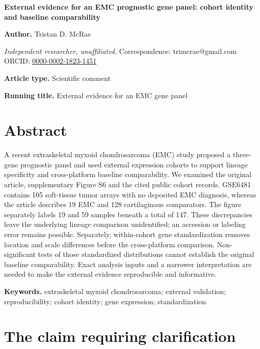 \documentclass[11pt]{article}
\begin{document}
{\LARGE\bfseries External evidence for an EMC prognostic gene panel: cohort identity and baseline comparability\par}\vspace{1em}

\textbf{Author.} Tristan D. McRae\par

\emph{Independent researcher, unaffiliated.} Correspondence: trimcrae@gmail.com ORCID: \href{https://orcid.org/0000-0002-1823-1451}{0000-0002-1823-1451}\par

\textbf{Article type.} Scientific comment\par

\textbf{Running title.} External evidence for an EMC gene panel\par

\section*{Abstract}

A recent extraskeletal myxoid chondrosarcoma (EMC) study proposed a three-gene prognostic panel and used external expression cohorts to support lineage specificity and cross-platform baseline comparability. We examined the original article, supplementary Figure S6 and the cited public cohort records. GSE6481 contains 105 soft-tissue tumor arrays with no deposited EMC diagnosis, whereas the article describes 19 EMC and 128 cartilaginous comparators. The figure separately labels 19 and 59 samples beneath a total of 147. These discrepancies leave the underlying lineage comparison unidentified; an accession or labeling error remains possible. Separately, within-cohort gene standardization removes location and scale differences before the cross-platform comparison. Non-significant tests of those standardized distributions cannot establish the original baseline comparability. Exact analysis inputs and a narrower interpretation are needed to make the external evidence reproducible and informative.\par

\textbf{Keywords.} extraskeletal myxoid chondrosarcoma; external validation; reproducibility; cohort identity; gene expression; standardization\par

\section*{The claim requiring clarification}
\end{document}
